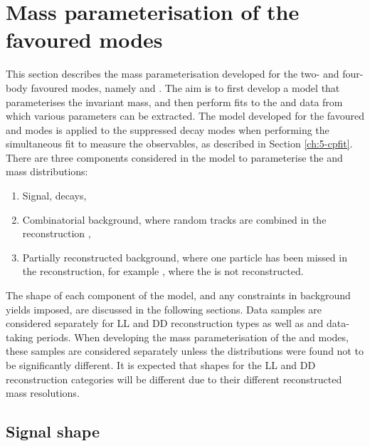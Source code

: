\clearpage

\section{Mass parameterisation of the favoured modes}
\label{sec:massfit}

This section describes the \Bm mass parameterisation developed for the two- and four-body favoured \Dz modes, namely \kpi and \kpipipi. The aim is to first develop a model that parameterises the invariant \Bm mass, and then perform fits to the \kpi and \kpipipi data from which various parameters can be extracted. The model developed for the favoured \kpi and \kpipipi modes is applied to the suppressed \Dz decay modes when performing the simultaneous fit to measure the \CP observables, as described in Section \ref{ch:5-cpfit}. There are three components considered in the model to parameterise the \kpi and \kpipipi \Bm mass distributions:
\begin{enumerate}
\item Signal, \decay{\Bm}{\D\Kstarm} decays,
\item Combinatorial background, where random tracks are combined in the reconstruction ,
\item Partially reconstructed background, where one particle has been missed in the reconstruction, for example \decay{\Bm}{(\decay{\Dstarz}{\Dz[\piz]})\Kstarm}, where the \piz is not reconstructed.
\end{enumerate}

The shape of each component of the model, and any constraints in background yields imposed, are discussed in the following sections. Data samples are considered separately for LL and DD \KS reconstruction types as well as \runone and \runtwo data-taking periods. When developing the mass parameterisation of the \kpi and \kpipipi modes, these samples are considered separately unless the distributions were found not to be significantly different. It is expected that shapes for the LL and DD \KS reconstruction categories will be different due to their different reconstructed \Bm mass resolutions.

\subsection{Signal shape}
\label{sec:massfit:signal}

